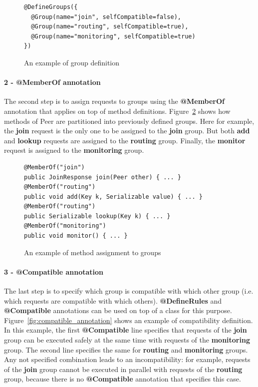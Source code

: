 \documentclass[11pt]{report}
\begin{document}
\begin{figure}[!ht]
	\lstset{language=java, numbers=left, numberstyle=\tiny, stepnumber=1, numbersep=5pt, basicstyle=\footnotesize}
	\begin{lstlisting}[frame=single]
@DefineGroups({
  @Group(name="join", selfCompatible=false),
  @Group(name="routing", selfCompatible=true),
  @Group(name="monitoring", selfCompatible=true)
})
 	\end{lstlisting}
\caption{An example of group definition}
\label{fig:group_annotation}
\end{figure}

\paragraph{2 - \textbf{@MemberOf} annotation}
The second step is to assign requests to groups using the \textbf{@MemberOf} annotation that applies on top of method definitions. Figure~\ref{fig:memberof_annotation} shows how methods of Peer are partitioned into previously defined groups. Here for example, the \textbf{join} request is the only one to be assigned to the  \textbf{join} group. But both \textbf{add} and \textbf{lookup} requests are assigned to the \textbf{routing} group. Finally, the \textbf{monitor} request is assigned to the \textbf{monitoring} group.

\begin{figure}[!ht]
	\lstset{language=java, numbers=left, numberstyle=\tiny, stepnumber=1, numbersep=5pt, basicstyle=\footnotesize}
	\begin{lstlisting}[frame=single]
@MemberOf("join")
public JoinResponse join(Peer other) { ... }
@MemberOf("routing")
public void add(Key k, Serializable value) { ... }
@MemberOf("routing")
public Serializable lookup(Key k) { ... }
@MemberOf("monitoring")
public void monitor() { ... }
 	\end{lstlisting}
\caption{An example of method assignment to groups}
\label{fig:memberof_annotation}
\end{figure}

\paragraph{3 - \textbf{@Compatible} annotation}
The last step is to specify which group is compatible with which other group (i.e. which requests are compatible with which others). \textbf{@DefineRules} and \textbf{@Compatible} annotations can be used on top of a class for this purpose. Figure~\ref{fig:compatible_annotation} shows an example of compatibility definition. In this example, the first \textbf{@Compatible} line specifies that requests of the \textbf{join} group can be executed safely at the same time with requests of the \textbf{monitoring} group. The second line specifies the same for \textbf{routing} and \textbf{monitoring} groups. Any not specified combination leads to an incompatibility: for example, requests of the \textbf{join} group cannot be executed in parallel with requests of the \textbf{routing} group, because there is no \textbf{@Compatible} annotation that specifies this case.
\end{document}
